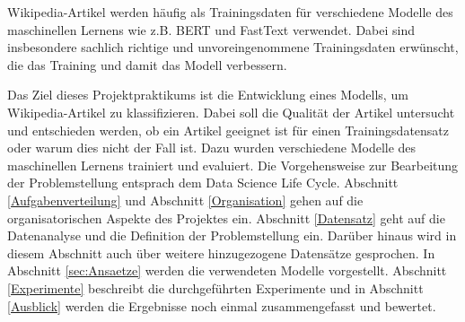 \label{Einleitung}
Wikipedia-Artikel werden häufig als Trainingsdaten für verschiedene Modelle des maschinellen Lernens wie z.B. BERT \cite{Devlin2018} und FastText \cite{Bojanowski2016} verwendet. Dabei sind insbesondere sachlich richtige und unvoreingenommene Trainingsdaten erwünscht, die das Training und damit das Modell verbessern.

Das Ziel dieses Projektpraktikums ist die Entwicklung eines Modells, um Wikipedia-Artikel zu klassifizieren. Dabei soll die Qualität der Artikel untersucht und entschieden werden, ob ein Artikel geeignet ist für einen Trainingsdatensatz oder warum dies nicht der Fall ist. Dazu wurden verschiedene Modelle des maschinellen Lernens trainiert und evaluiert. Die Vorgehensweise zur Bearbeitung der Problemstellung entsprach dem Data Science Life Cycle. Abschnitt \ref{Aufgabenverteilung} und Abschnitt \ref{Organisation} gehen auf die organisatorischen Aspekte des Projektes ein. Abschnitt \ref{Datensatz} geht auf die Datenanalyse und die Definition der Problemstellung ein. Darüber hinaus wird in diesem Abschnitt auch über weitere hinzugezogene Datensätze gesprochen. In Abschnitt \ref{sec:Ansaetze} werden die verwendeten Modelle vorgestellt.
Abschnitt \ref{Experimente} beschreibt die durchgeführten Experimente und in Abschnitt \ref{Ausblick} werden die Ergebnisse noch einmal zusammengefasst und bewertet.

